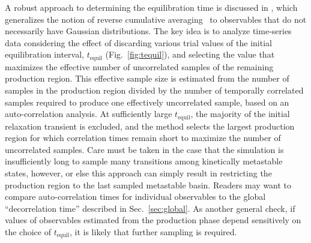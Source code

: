 
A robust approach to determining the equilibration time is discussed in \cite{Chodera-2016}, which generalizes the notion of reverse cumulative averaging~\cite{Yang2004} to observables that do not necessarily have Gaussian distributions.
The key idea is to analyze time-series data considering the effect of discarding various trial values of the initial equilibration interval, $t_{\mathrm{equil}}$ (Fig.\ \ref{fig:tequil}), and selecting the value that maximizes the effective number of uncorrelated samples of the remaining production region.
This effective sample size is estimated from the number of samples in the production region divided by the number of temporally correlated samples required to produce one effectively uncorrelated sample, based on an auto-correlation analysis.
At sufficiently large $t_{\mathrm{equil}}$, the majority of the initial relaxation transient is excluded, and the method selects the largest production region for which correlation times remain short to maximize the number of uncorrelated samples.
Care must be taken in the case that the simulation is insufficiently long to sample many transitions among kinetically metastable states, however, or else this approach can simply result in restricting the production region to the last sampled metastable basin.
Readers may want to compare auto-correlation times for individual observables to the global ``decorrelation time'' \cite{Lyman2007a} described in Sec.\ \ref{sec:global}.  
As another general check, if values of observables estimated from the production phase depend sensitively on the choice of $t_{\mathrm{equil}}$, it is likely that further sampling is required.



